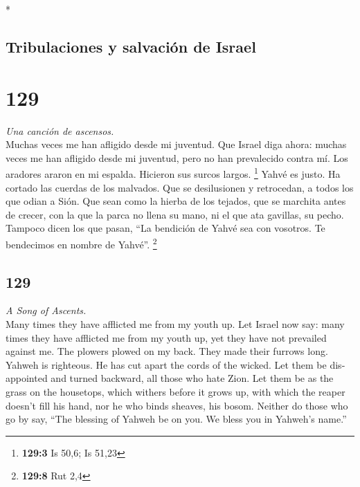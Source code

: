 \begin{paracol}{2}
\begin{otherlanguage}{english}
\end{otherlanguage}

\switchcolumn[0]*

\hypertarget{tribulaciones-y-salvaciuxf3n-de-israel}{%
\subsection{Tribulaciones y salvación de
Israel}\label{tribulaciones-y-salvaciuxf3n-de-israel}}

\hypertarget{section-256}{%
\section{129}\label{section-256}}

\emph{Una canción de ascensos.}\\
 Muchas veces me han afligido desde mi juventud. Que
Israel diga ahora:  muchas veces me han afligido desde mi
juventud, pero no han prevalecido contra mí.  Los aradores
araron en mi espalda. Hicieron sus surcos largos. \footnote{\textbf{129:3}
  Is 50,6; Is 51,23}  Yahvé es justo. Ha cortado las
cuerdas de los malvados.  Que se desilusionen y
retrocedan, a todos los que odian a Sión.  Que sean como
la hierba de los tejados, que se marchita antes de crecer,
 con la que la parca no llena su mano, ni el que ata
gavillas, su pecho.  Tampoco dicen los que pasan, ``La
bendición de Yahvé sea con vosotros. Te bendecimos en nombre de Yahvé''.
\footnote{\textbf{129:8} Rut 2,4}

\switchcolumn
\begin{otherlanguage}{english}

\hypertarget{section-257}{%
\section{129}\label{section-257}}

\emph{A Song of Ascents.}\\
 Many times they have afflicted me from my youth up. Let
Israel now say:  many times they have afflicted me from my
youth up, yet they have not prevailed against me.  The
plowers plowed on my back. They made their furrows long. 
Yahweh is righteous. He has cut apart the cords of the wicked.
 Let them be disappointed and turned backward, all those
who hate Zion.  Let them be as the grass on the housetops,
which withers before it grows up,  with which the reaper
doesn't fill his hand, nor he who binds sheaves, his bosom.
 Neither do those who go by say, ``The blessing of Yahweh
be on you. We bless you in Yahweh's name.''


\end{otherlanguage}
\end{paracol}
